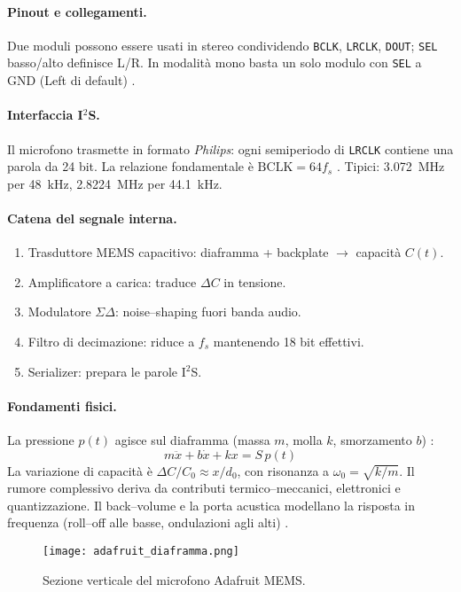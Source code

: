 \paragraph{Pinout e collegamenti.} 
Due moduli possono essere usati in stereo condividendo \texttt{BCLK}, \texttt{LRCLK}, \texttt{DOUT}; \texttt{SEL} basso/alto definisce L/R. 
In modalità mono basta un solo modulo con \texttt{SEL} a GND (Left di default) \cite{adafruit-guide}.

\paragraph{Interfaccia I$^2$S.} 
Il microfono trasmette in formato \emph{Philips}: ogni semiperiodo di \texttt{LRCLK} contiene una parola da 24 bit. 
La relazione fondamentale è $\mathrm{BCLK}=64f_s$ \cite{nordic-devzone}. 
Tipici: \SI{3.072}{MHz} per \SI{48}{kHz}, \SI{2.8224}{MHz} per \SI{44.1}{kHz}.

\paragraph{Catena del segnale interna.}
\begin{enumerate}
  \item Trasduttore MEMS capacitivo: diaframma + backplate $\to$ capacità $C(t)$.
  \item Amplificatore a carica: traduce $\Delta C$ in tensione.
  \item Modulatore $\Sigma\Delta$: noise–shaping fuori banda audio.
  \item Filtro di decimazione: riduce a $f_s$ mantenendo 18 bit effettivi.
  \item Serializer: prepara le parole I$^2$S.
\end{enumerate}

\paragraph{Fondamenti fisici.}
La pressione $p(t)$ agisce sul diaframma (massa $m$, molla $k$, smorzamento $b$) \cite{mems-acoustics}:
\[
m\ddot{x}+b\dot{x}+kx=S\,p(t)
\]
La variazione di capacità è $\Delta C/C_0 \approx x/d_0$, con risonanza a $\omega_0=\sqrt{k/m}$. 
Il rumore complessivo deriva da contributi termico–meccanici, elettronici e quantizzazione. 
Il back–volume e la porta acustica modellano la risposta in frequenza (roll–off alle basse, ondulazioni agli alti) \cite{mems-acoustics}.
\begin{figure}[H]
  \centering
  \texttt{[image: adafruit\_diaframma.png]}
  \caption{Sezione verticale del microfono Adafruit MEMS.}
  \label{fig:adafruit_diaframma}
  \end{figure}

